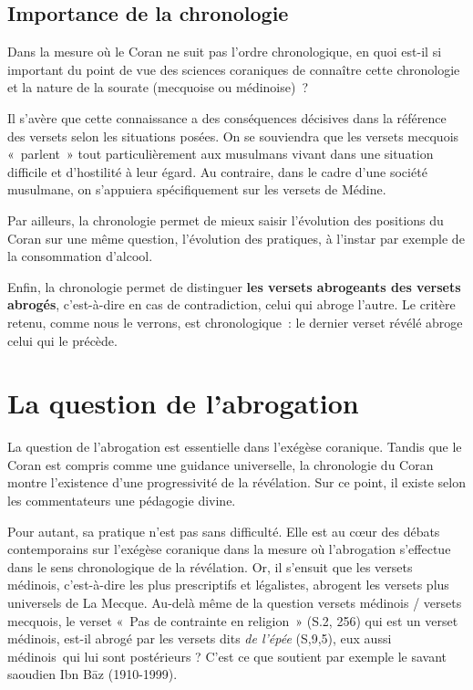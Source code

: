 \subsection{Importance de la
chronologie}

Dans la mesure où le Coran ne suit pas l'ordre chronologique, en quoi
est-il si important du point de vue des sciences coraniques de connaître
cette chronologie et la nature de la sourate (mecquoise ou médinoise)~?

Il s'avère que cette connaissance a des conséquences décisives dans la
référence des versets selon les situations posées. On se souviendra que
les versets mecquois «~parlent~» tout particulièrement aux musulmans
vivant dans une situation difficile et d'hostilité à leur égard. Au
contraire, dans le cadre d'une société musulmane, on s'appuiera
spécifiquement sur les versets de Médine.

Par ailleurs, la chronologie permet de mieux saisir l'évolution des
positions du Coran sur une même question, l'évolution des pratiques, à
l'instar par exemple de la consommation d'alcool.

Enfin, la chronologie permet de distinguer \textbf{les versets
abrogeants des versets abrogés}, c'est-à-dire en cas de contradiction,
celui qui abroge l'autre. Le critère retenu, comme nous le verrons, est
chronologique~: le dernier verset révélé abroge celui qui le précède.


\section{La question de l'abrogation
}\label{ii.-la-question-de-labrogation}

La question de l'abrogation est essentielle dans l'exégèse coranique.
Tandis que le Coran est compris comme une guidance universelle, la
chronologie du Coran montre l'existence d'une progressivité de la
révélation. Sur ce point, il existe selon les commentateurs une
pédagogie divine.

Pour autant, sa pratique n'est pas sans difficulté. Elle est au cœur des
débats contemporains sur l'exégèse coranique dans la mesure où
l'abrogation s'effectue dans le sens chronologique de la révélation. Or,
il s'ensuit que les versets médinois, c'est-à-dire les plus prescriptifs
et légalistes, abrogent les versets plus universels de La Mecque.
Au-delà même de la question versets médinois / versets mecquois, le
verset «~Pas de contrainte en religion~» (S.2, 256) qui est un verset
médinois, est-il abrogé par les versets dits \emph{de l'épée} (S,9,5),
eux aussi médinois~qui lui sont postérieurs ? C'est ce que soutient par
exemple le savant saoudien Ibn Bāz (1910-1999).

